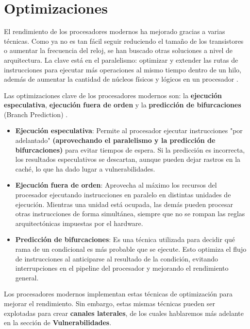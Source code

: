\documentclass[lettersize,compsoc]{IEEEtran}
\begin{document}
\section{Optimizaciones}

El rendimiento de los procesadores modernos ha mejorado gracias a varias técnicas. Como ya no es tan fácil seguir reduciendo el tamaño de los transistores o aumentar la frecuencia del reloj, se han buscado otras soluciones a nivel de arquitectura. La clave está en el paralelismo: optimizar y extender las rutas de instrucciones para ejecutar más operaciones al mismo tiempo dentro de un hilo, además de aumentar la cantidad de núcleos físicos y lógicos en un procesador \cite{paralelismo}.

Las optimizaciones clave de los procesadores modernos son: la \textbf{ejecución especulativa}, \textbf{ejecución fuera de orden} y la \textbf{predicción de bifurcaciones} (Branch Prediction) \cite{ref}.  

\begin{itemize}
\item \textbf{Ejecución especulativa}: Permite al procesador ejecutar instrucciones "por adelantado" \textbf{(aprovechando el paralelismo y la predicción de bifurcaciones)} para evitar tiempos de espera. Si la predicción es incorrecta, los resultados especulativos se descartan, aunque pueden dejar rastros en la caché, lo que ha dado lugar a vulnerabilidades.
\item \textbf{Ejecución fuera de orden}: Aprovecha al máximo los recursos del procesador ejecutando instrucciones en paralelo en distintas unidades de ejecución. Mientras una unidad está ocupada, las demás pueden procesar otras instrucciones de forma simultánea, siempre que no se rompan las reglas arquitectónicas impuestas por el hardware.
\item \textbf{Predicción de bifurcaciones}: Es una técnica utilizada para decidir qué rama de un condicional es más probable que se ejecute. Esto optimiza el flujo de instrucciones al anticiparse al resultado de la condición, evitando interrupciones en el pipeline del procesador y mejorando el rendimiento general.
\end{itemize}


Los procesadores modernos implementan estas técnicas de optimización para mejorar el rendimiento. Sin embargo, estas mismas técnicas pueden ser explotadas para crear \textbf{canales laterales}, de los cuales hablaremos más adelante en la sección de \textbf{Vulnerabilidades}.
\end{document}
